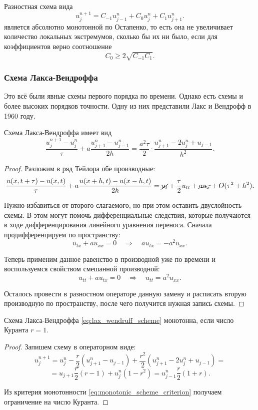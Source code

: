 \documentclass{article}
\begin{document}
\begin{theorem}
	Разностная схема вида
	\[u_j^{n+1}=C_{-1}u_{j-1}^n+C_0u_j^n+C_1u_{j+1}^n.\]
	является абсолютно монотонной по Остапенко, то есть она не увеличивает
	количество локальных экстремумов, сколько бы их ни было, если для
	коэффициентов верно соотношение
	\[C_0\ge 2\sqrt{C_{-1}C_1}.\]
\end{theorem}

\subsubsection{Схема Лакса-Вендроффа}
Это всё были явные схемы первого порядка по времени. Однако есть схемы и более
высоких порядков точности. Одну из них представили Лакс и Вендрофф в 1960 году.

\begin{lemma}\label{eq:lax_wendruff_scheme}
	Схема Лакса-Вендроффа имеет вид
	\[\frac{u_j^{n+1}-u_j^n}{\tau}+a\frac{u_{j+1}^n-u_{j-1}^n}{2h}=
	\frac{a^2\tau}{2}\cdot\frac{u_{j+1}^n-2u_j^n+u_{j-1}}{h^2}.\]
\end{lemma}

\begin{proof}
	Разложим в ряд Тейлора обе производные:
	\[\frac{u(x,t+\tau)-u(x,t)}{\tau}+a\frac{u(x+h,t)-u(x-h,t)}{2h}=
	\cancel{u_t}+\frac{\tau}{2}u_{tt}+\cancel{au_x}+O(\tau^2+h^2).\]

	Нужно избавиться от второго слагаемого, но при этом оставить
	двуслойность схемы. В этом могут помочь дифференциальные следствия,
	которые получаются в ходе дифференцирования линейного уравнения
	переноса. Сначала продифференцируем по пространству:
	\[u_{tx}+au_{xx}=0\quad\Rightarrow\quad au_{tx}=-a^2u_{xx}.\]

	Теперь применим данное равенство в производной уже по времени и
	воспользуемся свойством смешанной производной:
	\[u_{tt}+au_{tx}=0\quad\Rightarrow\quad u_{tt}=a^2u_{xx}.\]

	Осталось провести в разностном операторе данную замену и расписать
	вторую производную по пространству, после чего получится нужная
	запись схемы.
\end{proof}

\begin{lemma}
	Схема Лакса-Вендроффа \eqref{eq:lax_wendruff_scheme} монотонна,
	если число Куранта $r=1$.
\end{lemma}

\begin{proof}
	Запишем схему в операторном виде:
	\[u_j^{n+1}=u_j^n-\frac{r}{2}(u_{j+1}^n-u_{j-1})+
	\frac{r^2}{2}(u_{j+1}^n-2u_j^n+u_{j-1})=\]
	\[=u_{j+1}\frac{r}{2}(r-1)+u_j^n(1-r^2)=u_{j-1}^n\frac{r}{2}(1+r).\]

	Из критерия монотонности \eqref{eq:monotonic_scheme_criterion} получаем
	ограничение на число Куранта.
\end{proof}
\end{document}
